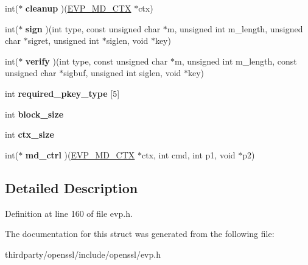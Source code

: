 \begin{DoxyCompactItemize}
\item 
\mbox{\label{structenv__md__st_acf24becb13e74703b0995ab0f310dc69}} 
int($\ast$ {\bfseries cleanup} )(\hyperlink{structenv__md__ctx__st}{E\+V\+P\+\_\+\+M\+D\+\_\+\+C\+TX} $\ast$ctx)
\item 
\mbox{\label{structenv__md__st_a6c2688ca16aa6280d183f19932a57d3e}} 
int($\ast$ {\bfseries sign} )(int type, const unsigned char $\ast$m, unsigned int m\+\_\+length, unsigned char $\ast$sigret, unsigned int $\ast$siglen, void $\ast$key)
\item 
\mbox{\label{structenv__md__st_a10b15f12475626688692fab5b0e51223}} 
int($\ast$ {\bfseries verify} )(int type, const unsigned char $\ast$m, unsigned int m\+\_\+length, const unsigned char $\ast$sigbuf, unsigned int siglen, void $\ast$key)
\item 
\mbox{\label{structenv__md__st_a508c2571ca6389b14b054c49ba3fe7b3}} 
int {\bfseries required\+\_\+pkey\+\_\+type} \mbox{[}5\mbox{]}
\item 
\mbox{\label{structenv__md__st_ae76b8152ca0ed7e4442d1210ad4bdf88}} 
int {\bfseries block\+\_\+size}
\item 
\mbox{\label{structenv__md__st_a3c34817fb557d912821c8f06ae5945ba}} 
int {\bfseries ctx\+\_\+size}
\item 
\mbox{\label{structenv__md__st_a0f91a62137d598f55b1e7a321ccbf100}} 
int($\ast$ {\bfseries md\+\_\+ctrl} )(\hyperlink{structenv__md__ctx__st}{E\+V\+P\+\_\+\+M\+D\+\_\+\+C\+TX} $\ast$ctx, int cmd, int p1, void $\ast$p2)
\end{DoxyCompactItemize}


\subsection{Detailed Description}


Definition at line 160 of file evp.\+h.



The documentation for this struct was generated from the following file\+:\begin{DoxyCompactItemize}
\item 
thirdparty/openssl/include/openssl/evp.\+h\end{DoxyCompactItemize}
